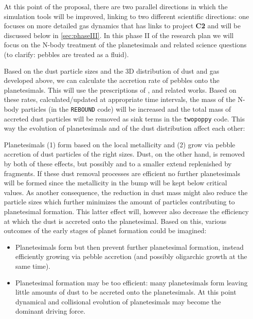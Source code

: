 \documentclass[10pt,fleqn,twoside]{article}
\newcommand{\twopoppy}{\texttt{twopoppy}\xspace}
\newcommand{\rebound}{\texttt{REBOUND}\xspace}
\begin{document}
At this point of the proposal, there are two parallel directions in
which the simulation tools will be improved, linking to two different
scientific directions: one focuses on more detailed gas dynamics that
has links to project \textbf{C2} and will be discussed below in
\cref{sec:phaseIII}. In this phase II of the research plan we will
focus on the N-body treatment of the planetesimals and related science
questions (to clarify: pebbles are treated as a fluid).

Based on the dust particle sizes and the 3D distribution of dust and
gas developed above, we can calculate the accretion rate of pebbles
onto the planetesimals. This will use the prescriptions of
\citet{2010A&A...520A..43O}, \citet{2016A&A...586A..66V} and related
works. Based on these rates, calculated/updated at appropriate time
intervals, the mass of the N-body particles (in the \rebound code)
will be increased and the total mass of accreted dust particles will
be removed as sink terms in the \twopoppy code. This way the evolution
of planetesimals and of the dust distribution affect each other:

Planetesimals (1) form based on the local metallicity and (2) grow via
pebble accretion of dust particles of the right sizes. Dust, on the
other hand, is removed by both of these effects, but possibly and to a
smaller extend replenished by fragments. If these dust removal
processes are efficient no further planetesimals will be formed since
the metallicity in the bump will be kept below critical values.
As another consequence, the reduction in dust mass might also reduce
the particle sizes which further minimizes the amount of particles
contributing to planetesimal formation. This latter effect will,
however also decrease the efficiency at which the dust is accreted
onto the planetesimal.
Based on this, various outcomes of the early stages of planet
formation could be imagined:
\begin{itemize}
  \item Planetesimals form but then prevent further planetesimal
  formation, instead efficiently growing via pebble accretion (and
  possibly oligarchic growth at the same time).
  \item  Planetesimal formation may be too efficient: many
  planetesimals form leaving little amounts of dust to be accreted
  onto the planetesimals. At this point dynamical and collisional
  evolution of planetesimals may become the dominant driving force.
\end{itemize}
\end{document}
